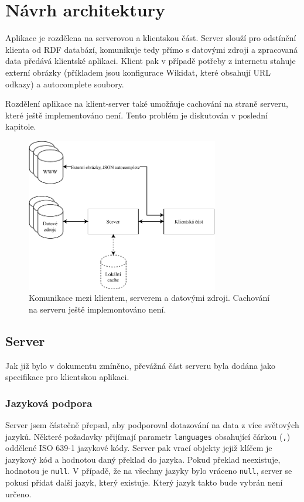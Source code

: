 \chapter{Návrh architektury}

Aplikace je rozdělena na serverovou a klientskou část. Server slouží pro odstínění klienta od RDF databází, komunikuje tedy přímo s datovými zdroji a zpracovaná data předává klientské aplikaci. Klient pak v případě potřeby z internetu stahuje externí obrázky (příkladem jsou konfigurace Wikidat, které obsahují URL odkazy) a autocomplete soubory.

Rozdělení aplikace na klient-server také umožňuje cachování na straně serveru, které ještě implementováno není. Tento problém je diskutován v poslední kapitole.

\begin{figure}[h]
    \centering
    \includegraphics[width=0.75\textwidth]{media/communication.pdf}
    \caption{Komunikace mezi klientem, serverem a datovými zdroji. Cachování na serveru ještě implemontováno není.}
\end{figure}

\section{Server}
Jak již bylo v dokumentu zmíněno, převážná část serveru byla dodána jako specifikace pro klientskou aplikaci.

\subsection{Jazyková podpora} \label{jazykova-podpora}
Server jsem částečně přepsal, aby podporoval dotazování na data z více světových jazyků. Některé požadavky přijímají parametr \texttt{languages} obsahující čárkou (\texttt{,}) oddělené ISO 639-1 jazykové kódy. Server pak vrací objekty jejiž klíčem je jazykový kód a hodnotou daný překlad do jazyka. Pokud překlad neexistuje, hodnotou je \texttt{null}. V případě, že na všechny jazyky bylo vráceno \texttt{null}, server se pokusí přidat další jazyk, který existuje. Který jazyk takto bude vybrán není určeno.

